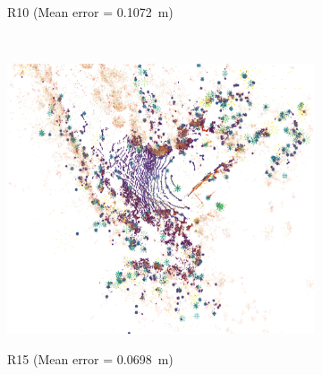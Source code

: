 \begin{figure}[tpbh!]
\begin{center}
\begin{subfigure}[b]{0.3\textwidth}
			\label{fig:r10_pcl}
			\caption{R10 (Mean error = \SI{0.1072}{m})}
			\vspace{0.2in}
		\end{subfigure}%
		~
		\begin{subfigure}[b]{0.3\textwidth}
			\includegraphics[width=\linewidth]{figs/run10_init_fail/run_15.pdf}
			\label{fig:r15_pcl}
			\caption{R15 (Mean error = \SI{0.0698}{m})}
			\vspace{0.2in}
		\end{subfigure}%
		~
		\begin{subfigure}[b]{0.07\textwidth}

\end{subfigure}
\end{center}
\end{figure}
